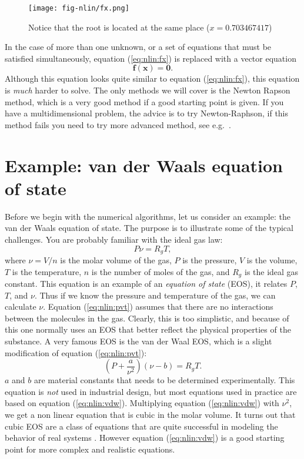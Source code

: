 \documentclass[graybox,sectrefs,envcountresetchap,open=right,final]{svmonodo}
\begin{document}
\begin{figure}[!ht]  %
  \centerline{\texttt{[image: fig-nlin/fx.png]}}
  \caption{
  Notice that the root is located at the same place ($x=0.703467417$) \label{fig:nlin:fx}
  }
\end{figure}

In the case of more than one unknown, or a set of equations that must be satisfied simultaneously, equation (\ref{eq:nlin:fx}) is replaced with a vector equation
\begin{equation}
\mathbf{f}(\mathbf{x})=\mathbf{0}.
\label{eq:nlin:fvec}
\end{equation}
Although this equation looks quite similar to equation (\ref{eq:nlin:fx}), this equation is \emph{much} harder to solve. The only methods we will cover is the Newton Rapson method, which is a very good method if a good starting point is given. If you have a multidimensional problem, the advice is to try Newton-Raphson, if this method fails you need to try more advanced method, see e.g.~\cite{press2001}.

\section{Example: van der Waals equation of state}
Before we begin with the numerical algorithms, let us consider an example: the van der Waals equation of state. The purpose is to illustrate some of the typical challenges. You are probably familiar with the ideal gas law:
\begin{equation}
P\nu=R_gT,
\label{eq:nlin:pvt}
\end{equation}
where $\nu=V/n$ is the molar volume of the gas, $P$ is the pressure, $V$ is the volume, $T$ is the temperature, $n$ is the number of moles of the gas, and $R_g$ is the ideal gas constant.  This equation is an example of an \emph{equation of state} (EOS), it relates $P$, $T$, and $\nu$. Thus if we know the pressure and temperature of the gas, we can calculate $\nu$. Equation (\ref{eq:nlin:pvt}) assumes that there are no interactions between the molecules in the gas. Clearly, this is too simplistic, and because of this one normally uses an EOS that better reflect the physical properties of the substance. A very famous EOS is the van der Waal EOS, which is a slight modification of equation (\ref{eq:nlin:pvt}):
\begin{equation}
\left(P+\frac{a}{\nu^2}\right)\left(\nu-b\right)=R_gT.
\label{eq:nlin:vdw}
\end{equation}
$a$ and $b$ are material constants that needs to be determined experimentally. This equation is \emph{not} used in industrial design, but most equations used in practice are based on equation (\ref{eq:nlin:vdw}). Multiplying equation (\ref{eq:nlin:vdw}) with $\nu^2$, we get a non linear equation that is cubic in the molar volume. It turns out that cubic EOS are a class of equations that are quite successful in modeling the behavior of real systems \cite{peng1976new}. However equation (\ref{eq:nlin:vdw}) is a good starting point for more complex and realistic equations.
\end{document}
